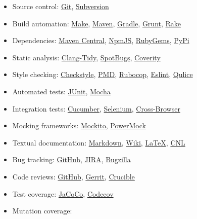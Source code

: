\documentclass[nobrand,anonymous,nodate,nosecurity]{huawei}
\begin{document}
{\begin{itemize}
\item Source control:
	\href{https://git-scm.com}{Git},
	\href{https://subversion.apache.org}{Subversion}
\item Build automation:
	\href{https://en.wikipedia.org/wiki/Make_(software)}{Make},
	\href{https://maven.apache.org}{Maven},
	\href{https://gradle.org}{Gradle},
	\href{https://gruntjs.com}{Grunt},
	\href{https://github.com/ruby/rake}{Rake}
\item Dependencies:
	\href{https://maven.apache.org}{Maven Central},
	\href{https://www.npmjs.com}{NpmJS},
	\href{https://rubygems.org}{RubyGems},
	\href{https://pypi.org/project/pip/}{PyPi}
\item Static analysis:
	\href{https://clang.llvm.org/extra/clang-tidy/}{Clang-Tidy},
	\href{https://spotbugs.github.io}{SpotBugs},
	\href{https://scan.coverity.com}{Coverity}
\item Style checking:
  \href{https://checkstyle.sourceforge.io}{Checkstyle},
  \href{https://pmd.github.io}{PMD},
  \href{https://rubocop.org}{Rubocop},
  \href{https://eslint.org}{Eslint},
  \href{https://www.qulice.com}{Qulice}
\item Automated tests:
	\href{https://junit.org/}{JUnit},
	\href{https://mochajs.org}{Mocha}
\item Integration tests:
  \href{https://cucumber.io}{Cucumber},
  \href{https://www.selenium.dev}{Selenium},
  \href{https://en.wikipedia.org/wiki/Cross-browser_testing}{Cross-Browser}
\item Mocking frameworks:
	\href{https://site.mockito.org}{Mockito},
	\href{https://github.com/powermock/powermock}{PowerMock}
\item Textual documentation:
	\href{https://en.wikipedia.org/wiki/Markdown}{Markdown},
	\href{https://en.wikipedia.org/wiki/Wiki}{Wiki},
	\href{https://en.wikipedia.org/wiki/LaTeX}{LaTeX},
  \href{https://en.wikipedia.org/wiki/Controlled_natural_language}{CNL}
\item Bug tracking:
	\href{github.com/}{GitHub},
	\href{https://www.atlassian.com/software/jira}{JIRA},
	\href{https://www.bugzilla.org}{Bugzilla}
\item Code reviews:
	\href{github.com/}{GitHub},
	\href{https://www.gerritcodereview.com}{Gerrit},
	\href{https://www.atlassian.com/software/crucible}{Crucible}
\item Test coverage:
	\href{https://www.eclemma.org/jacoco/}{JaCoCo},
	\href{codecov.io/}{Codecov}
\item Mutation coverage:

\end{itemize}}
\end{document}
